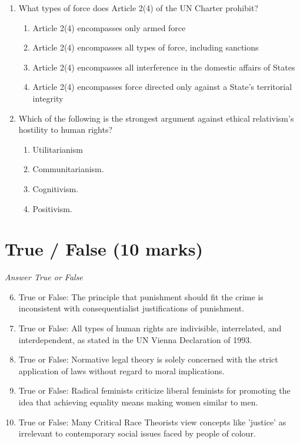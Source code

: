 \documentclass[12pt]{article}
\begin{document}
\begin{enumerate}[label=\arabic*.]
\begin{enumerate}[label=(\alph*)]
\end{enumerate}
\item What types of force does Article 2(4) of the UN Charter prohibit?
\begin{enumerate}[label=(\alph*)]
    \item Article 2(4) encompasses only armed force
    \item Article 2(4) encompasses all types of force, including sanctions
    \item Article 2(4) encompasses all interference in the domestic affairs of States
    \item Article 2(4) encompasses force directed only against a State's territorial integrity
\end{enumerate}
\item Which of the following is the strongest argument against ethical relativism's hostility to human rights?
\begin{enumerate}[label=(\alph*)]
    \item Utilitarianism
    \item Communitarianism.
    \item Cognitivism.
    \item Positivism.
\end{enumerate}
\end{enumerate}

\section*{True / False (10 marks)}
\textit{Answer True or False}
\begin{enumerate}[label=\arabic*.]
\setcounter{enumi}{5}
\item True or False: The principle that punishment should fit the crime is inconsistent with consequentialist justifications of punishment.
\item True or False: All types of human rights are indivisible, interrelated, and interdependent, as stated in the UN Vienna Declaration of 1993.
\item True or False: Normative legal theory is solely concerned with the strict application of laws without regard to moral implications.
\item True or False: Radical feminists criticize liberal feminists for promoting the idea that achieving equality means making women similar to men.
\item True or False: Many Critical Race Theorists view concepts like 'justice' as irrelevant to contemporary social issues faced by people of colour.
\end{enumerate}
\end{document}
